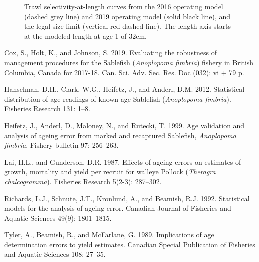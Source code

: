 \documentclass[11pt]{book}
\begin{document}
\newpage
\begin{figure}[htb]

{\centering {} 

}

\caption{Trawl selectivity-at-length curves from the 2016 operating model (dashed grey line) and 2019 operating model (solid black line), and the legal size limit (vertical red dashed line). The length axis starts at the modeled length at age-1 of 32cm.}\label{fig:unnamed-chunk-9}
\end{figure}
\hypertarget{refs}{}
\leavevmode\hypertarget{ref-cox2019evaluating}{}%
Cox, S., Holt, K., and Johnson, S. 2019. Evaluating the robustness of management procedures for the Sablefish (\emph{Anoplopoma fimbria}) fishery in British Columbia, Canada for 2017-18. Can. Sci. Adv. Sec. Res. Doc (032): vi + 79 p.

\leavevmode\hypertarget{ref-hanselman2012statistical}{}%
Hanselman, D.H., Clark, W.G., Heifetz, J., and Anderl, D.M. 2012. Statistical distribution of age readings of known-age Sablefish (\emph{Anoplopoma fimbria}). Fisheries Research 131: 1--8.

\leavevmode\hypertarget{ref-heifetz1999age}{}%
Heifetz, J., Anderl, D., Maloney, N., and Rutecki, T. 1999. Age validation and analysis of ageing error from marked and recaptured Sablefish, \emph{Anoplopoma fimbria}. Fishery bulletin 97: 256--263.

\leavevmode\hypertarget{ref-lai1987effects}{}%
Lai, H.L., and Gunderson, D.R. 1987. Effects of ageing errors on estimates of growth, mortality and yield per recruit for walleye Pollock (\emph{Theragra chalcogramma}). Fisheries Research 5(2-3): 287--302.

\leavevmode\hypertarget{ref-richards1992statistical}{}%
Richards, L.J., Schnute, J.T., Kronlund, A., and Beamish, R.J. 1992. Statistical models for the analysis of ageing error. Canadian Journal of Fisheries and Aquatic Sciences 49(9): 1801--1815.

\leavevmode\hypertarget{ref-tyler1989implications}{}%
Tyler, A., Beamish, R., and McFarlane, G. 1989. Implications of age determination errors to yield estimates. Canadian Special Publication of Fisheries and Aquatic Sciences 108: 27--35.

\MakeAvailable
\end{document}
